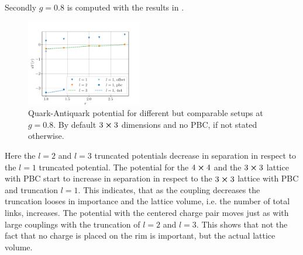 Secondly $g=0.8$ is computed with the results in .
\begin{figure}[h]
	\begin{center}
		\includegraphics[width=0.45\textwidth]{images/quark_antiquark_potential_small_g.pdf}
	\end{center}
	\caption{Quark-Antiquark potential for different but comparable setups at $g=\num{0.8}$. By default $3\cross3$ dimensions and no PBC, if not stated otherwise.}\label{fig:qqbars}
\end{figure}
Here the $l=2$ and $l=3$ truncated potentials decrease in separation in respect to the $l=1$ truncated potential. The potential for the $4\cross 4$ and the $3\cross3$ lattice with PBC start to increase in separation in respect to the $3\cross3$ lattice with PBC and truncation $l=1$. This indicates, that as the coupling decreases the truncation looses in importance and the lattice volume, i.e. the number of total links, increases. The potential with the centered charge pair moves just as with large couplings with the truncation of $l=2$ and $l=3$. This shows that not the fact that no charge is placed on the rim is important, but the actual lattice volume.

